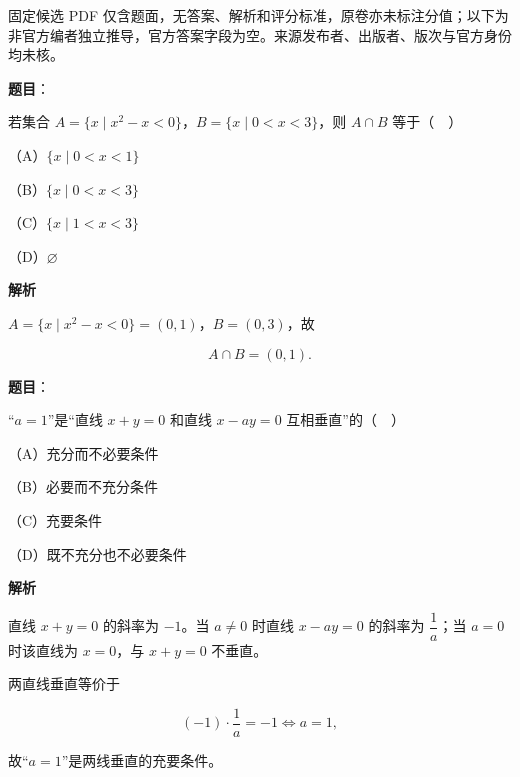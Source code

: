 

\begin{gktip}
固定候选 PDF 仅含题面，无答案、解析和评分标准，原卷亦未标注分值；以下为非官方编者独立推导，官方答案字段为空。来源发布者、出版者、版次与官方身份均未核。
\end{gktip}

\begin{answer}

\textbf{题目}：

若集合 $A=\{x\mid x^2-x<0\}$，$B=\{x\mid 0<x<3\}$，则 $A\cap B$ 等于（　）

（A）$\{x\mid 0<x<1\}$

（B）$\{x\mid 0<x<3\}$

（C）$\{x\mid 1<x<3\}$

（D）$\varnothing$

\textbf{解析}

$A=\{x\mid x^2-x<0\}=(0,1)$，$B=(0,3)$，故

\nopagebreak[4]
\[A\cap B=(0,1).\]


\end{answer}
\begin{answer}

\textbf{题目}：

“$a=1$”是“直线 $x+y=0$ 和直线 $x-ay=0$ 互相垂直”的（　）

（A）充分而不必要条件

（B）必要而不充分条件

（C）充要条件

（D）既不充分也不必要条件

\textbf{解析}

直线 $x+y=0$ 的斜率为 $-1$。当 $a\neq0$ 时直线 $x-ay=0$ 的斜率为 $\dfrac1a$；当 $a=0$ 时该直线为 $x=0$，与 $x+y=0$ 不垂直。

两直线垂直等价于

\nopagebreak[4]
\[(-1)\cdot\frac1a=-1\iff a=1,\]

故“$a=1$”是两线垂直的充要条件。


\end{answer}
